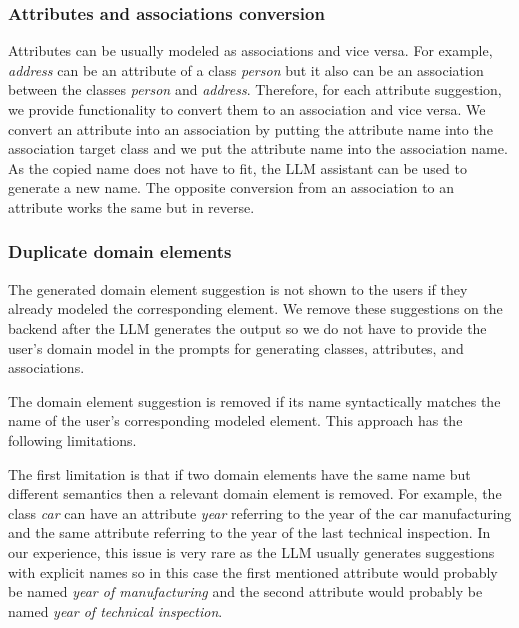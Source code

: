 \subsubsection{Attributes and associations conversion}
\label{sec:attributes_and_associations_conversion}
Attributes can be usually modeled as associations and vice versa. For example, \textit{address} can be an attribute of a class \textit{person} but it also can be an association between the classes \textit{person} and \textit{address}. Therefore, for each attribute suggestion, we provide functionality to convert them to an association and vice versa. We convert an attribute into an association by putting the attribute name into the association target class and we put the attribute name into the association name. As the copied name does not have to fit, the LLM assistant can be used to generate a new name. The opposite conversion from an association to an attribute works the same but in reverse.


\subsubsection{Duplicate domain elements}
\label{duplicate_domain_elements}

The generated domain element suggestion is not shown to the users if they already modeled the corresponding element. We remove these suggestions on the backend after the LLM generates the output so we do not have to provide the user's domain model in the prompts for generating classes, attributes, and associations.

The domain element suggestion is removed if its name syntactically matches the name of the user's corresponding modeled element. This approach has the following limitations.

The first limitation is that if two domain elements have the same name but different semantics then a relevant domain element is removed. For example, the class \textit{car} can have an attribute \textit{year} referring to the year of the car manufacturing and the same attribute referring to the year of the last technical inspection. In our experience, this issue is very rare as the LLM usually generates suggestions with explicit names so in this case the first mentioned attribute would probably be named \textit{year of manufacturing} and the second attribute would probably be named \textit{year of technical inspection}.

